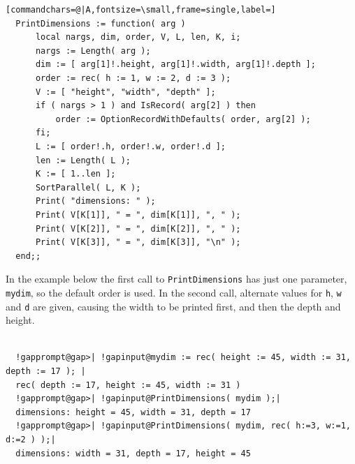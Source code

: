 \documentclass[a4paper,11pt]{report}
\begin{document}
{{\begin{Verbatim}[commandchars=@|A,fontsize=\small,frame=single,label=]
  PrintDimensions := function( arg ) 
      local nargs, dim, order, V, L, len, K, i; 
      nargs := Length( arg ); 
      dim := [ arg[1]!.height, arg[1]!.width, arg[1]!.depth ]; 
      order := rec( h := 1, w := 2, d := 3 ); 
      V := [ "height", "width", "depth" ]; 
      if ( nargs > 1 ) and IsRecord( arg[2] ) then 
          order := OptionRecordWithDefaults( order, arg[2] ); 
      fi; 
      L := [ order!.h, order!.w, order!.d ]; 
      len := Length( L );
      K := [ 1..len ]; 
      SortParallel( L, K ); 
      Print( "dimensions: " ); 
      Print( V[K[1]], " = ", dim[K[1]], ", " );
      Print( V[K[2]], " = ", dim[K[2]], ", " );
      Print( V[K[3]], " = ", dim[K[3]], "\n" );
  end;;
\end{Verbatim}
 In the example below the first call to \texttt{PrintDimensions} has just one parameter, \texttt{mydim}, so the default order is used. In the second call, alternate values for \texttt{h}, \texttt{w} and \texttt{d} are given, causing the width to be printed first, and then the depth and
height. 
\begin{Verbatim}[commandchars=!@|,fontsize=\small,frame=single,label=Example]
  
  !gapprompt@gap>| !gapinput@mydim := rec( height := 45, width := 31, depth := 17 ); |
  rec( depth := 17, height := 45, width := 31 )
  !gapprompt@gap>| !gapinput@PrintDimensions( mydim );|
  dimensions: height = 45, width = 31, depth = 17
  !gapprompt@gap>| !gapinput@PrintDimensions( mydim, rec( h:=3, w:=1, d:=2 ) );|
  dimensions: width = 31, depth = 17, height = 45
  
\end{Verbatim}
 }

 }

         
\end{document}
